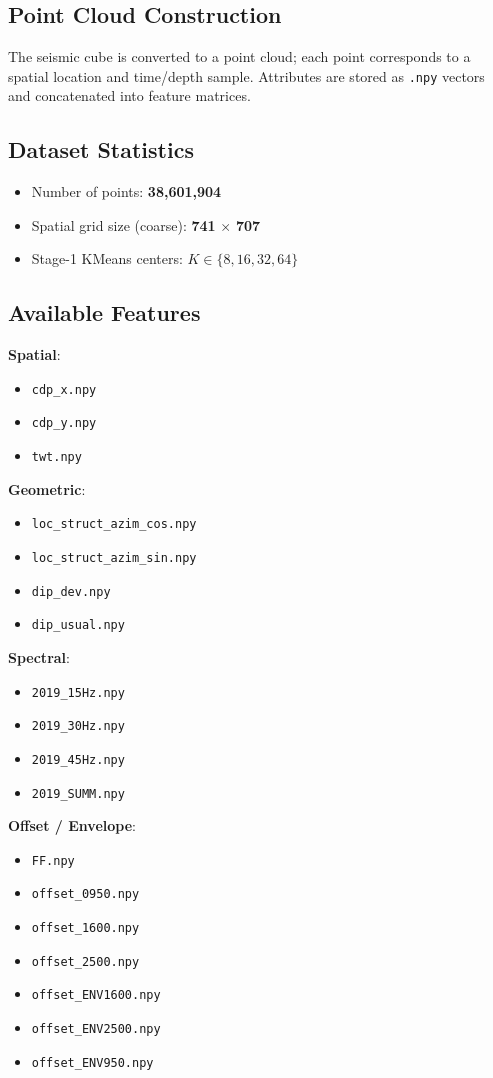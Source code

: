 \documentclass{article}
\begin{document}
\subsection{Point Cloud Construction}
The seismic cube is converted to a point cloud; each point corresponds to a spatial location and time/depth sample. Attributes are stored as \texttt{.npy} vectors and concatenated into feature matrices.

\subsection{Dataset Statistics}
\begin{itemize}
\item Number of points: \textbf{38,601,904}
\item Spatial grid size (coarse): \textbf{741} $\times$ \textbf{707}
\item Stage-1 KMeans centers: $K \in \{8,16,32,64\}$
\end{itemize}

\subsection{Available Features}
\textbf{Spatial}:
\begin{itemize}
\item \texttt{cdp\_x.npy}
\item \texttt{cdp\_y.npy}
\item \texttt{twt.npy}
\end{itemize}

\textbf{Geometric}:
\begin{itemize}
\item \texttt{loc\_struct\_azim\_cos.npy}
\item \texttt{loc\_struct\_azim\_sin.npy}
\item \texttt{dip\_dev.npy}
\item \texttt{dip\_usual.npy}
\end{itemize}

\textbf{Spectral}:
\begin{itemize}
\item \texttt{2019\_15Hz.npy}
\item \texttt{2019\_30Hz.npy}
\item \texttt{2019\_45Hz.npy}
\item \texttt{2019\_SUMM.npy}
\end{itemize}

\textbf{Offset / Envelope}:
\begin{itemize}
\item \texttt{FF.npy}
\item \texttt{offset\_0950.npy}
\item \texttt{offset\_1600.npy}
\item \texttt{offset\_2500.npy}
\item \texttt{offset\_ENV1600.npy}
\item \texttt{offset\_ENV2500.npy}
\item \texttt{offset\_ENV950.npy}
\end{itemize}
\end{document}
